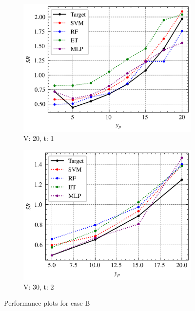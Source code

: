 \begin{figure}[H]
    \begin{tcolorbox}[arc=0pt,boxrule=0.5pt]
        \begin{subfigure}{0.5\textwidth}
            \includegraphics[width=\textwidth]{chap5/images/performance_20_1}
            \caption{V: 20, t: 1}
            \label{fig:performance-20-1}
        \end{subfigure}
        \hfill
        \begin{subfigure}{0.5\textwidth}
            \includegraphics[width=\textwidth]{chap5/images/performance_30_2}
            \caption{V: 30, t: 2}
            \label{fig:performance-30_2.0}
        \end{subfigure}
    \end{tcolorbox}
    \caption{Performance plots for case B}
    \label{fig:performance-case-b}
\end{figure}

